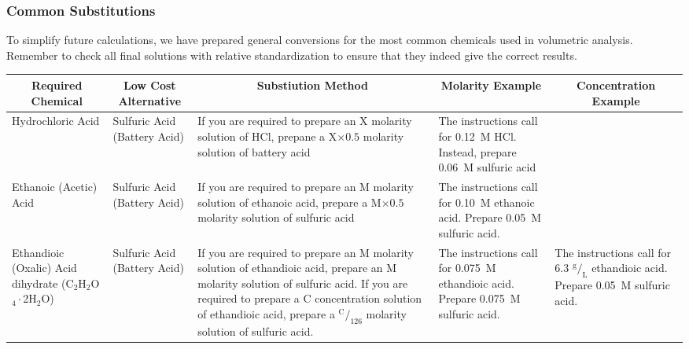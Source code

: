 \subsubsection{Common Substitutions}
\label{sec:commonsubs}
To simplify future calculations, we have prepared general conversions for the most common chemicals used in volumetric analysis. Remember to check all final solutions with relative standardization to ensure that they indeed give the correct results.

\begin{landscape}
\thispagestyle{empty}

\begin{table}
\centering

\begin{tabular}{| p{3.5cm} | p{4cm} | p{8cm} | p{4cm} | p{4cm} |}
\hline

\multicolumn{1}{|c}{\textbf{Required Chemical}} & 
\multicolumn{1}{|c}{\textbf{Low Cost Alternative}} & 
\multicolumn{1}{|c}{\textbf{Substiution Method}} & 
\multicolumn{1}{|c}{\textbf{Molarity Example}} & 
\multicolumn{1}{|c|}{\textbf{Concentration Example}} \\ \hline

Hydrochloric Acid & 
Sulfuric Acid (Battery Acid) & 
If you are required to prepare an X molarity solution of HCl, prepane a X$\times 0.5$ molarity solution of battery acid & 
The instructions call for 0.12~M HCl. Instead, prepare 0.06~M sulfuric acid & 
 \\ \hline

Ethanoic (Acetic) Acid & 
Sulfuric Acid (Battery Acid) & 
If you are required to prepare an M molarity solution of ethanoic acid, prepare a M$\times 0.5$ molarity solution of sulfuric acid & 
The instructions call for 0.10~M ethanoic acid. Prepare 0.05~M sulfuric acid. & 
 \\ \hline

Ethandioic (Oxalic) Acid dihydrate (C$_{2}$H$_{2}$O$_{4} \cdot$2H$_{2}$O) & 
Sulfuric Acid (Battery Acid) & 
If you are required to prepare an M molarity solution of ethandioic acid, prepare an M molarity solution of sulfuric acid. If you are required to prepare a C concentration solution of ethandioic acid, prepare a $^\text{C}/_{126}$ molarity solution of sulfuric acid. & 
The instructions call for 0.075~M ethandioic acid. Prepare 0.075~M sulfuric acid. & 
The instructions call for 6.3 $^\text{g}/_\text{L}$ ethandioic acid. Prepare 0.05~M sulfuric acid. \\ \hline


\end{tabular}
\end{table}
\end{landscape}
